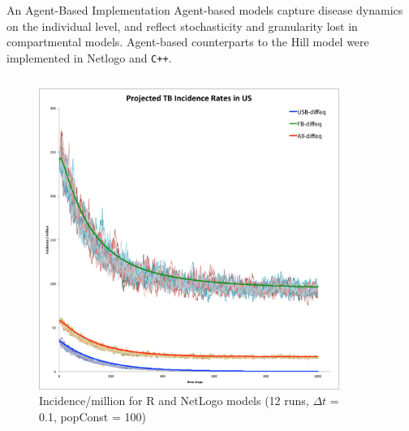 \documentclass[final]{beamer}
\begin{document}
\begin{frame}
\begin{columns}
    \begin{column}{.3\textwidth}
      \vspace{-.5em}
      \begin{block}{An Agent-Based Implementation}
        Agent-based models capture disease dynamics on the individual level, and
        reflect stochasticity and granularity lost in compartmental models.
        Agent-based counterparts to the Hill model were implemented in Netlogo
        and \texttt{C++}.
        \begin{columns}
          \vspace{-2em}
          \begin{column}{.45\textwidth}
            \begin{figure}[h]
              \begin{center}
                \includegraphics[width=\textwidth]{NLHMinc}
              \end{center}
              \caption{Incidence/million for R and NetLogo models (12 runs, $\Delta t$ = 0.1, popConst = 100)}
              \label{fig:NLHMinc}
            \end{figure}
          \end{column}
          \begin{column}{.45\textwidth}
            \begin{figure}[h]

\end{figure}
\end{column}
\end{columns}
\end{block}
\end{column}
\end{columns}
\end{frame}
\end{document}
